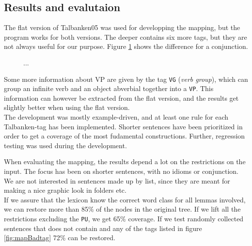 \documentclass{report}
\begin{document}
\subsection{Results and evalutaion}
The flat version of Talbanken05 was used for developping the mapping, but
the program works for both versions.
The deeper contains six more tags, but they are not always useful for our       
purpose. Figure \ref{fig:mappDeepFlat} shows the difference for a conjunction.
\begin{figure}[h]
\centering
{}
\caption{...}
\label{fig:mappDeepFlat}
\end{figure}

Some more information about VP are given by the tag \verb|VG| (\emph{verb group}),
which can group an infinite verb and an object abverbial together into a \verb|VP|.
This information can however be extracted from the flat version, and the results
get slightly better when using the flat version. \\


The development was mostly example-driven, and at least one rule for each
Talbanken-tag has been implemented.
Shorter sentences have been prioritized in order to get a coverage of the most
fudamental constructions. Further,  
regression testing was used during the development. %

When evaluating the mapping, the results depend a lot on the restrictions on the
input. 
The focus has been on shorter sentences, with no idioms or conjunction. We are
not interested in sentences made up by list, since they are meant for making
a nice graphic look in folders etc.\\


If we
assure that the lexicon know the correct word class for all lemmas involved, we
can restore more than 85\% of the nodes in the original tree.
If we lift all the restrictions excluding the \verb|PU|, we get
65\% coverage.
If we test randomly collected sentences that does not contain and any of the tags listed
in figure \ref{fig:mapBadtag} 72\% can be restored. \\
\end{document}
